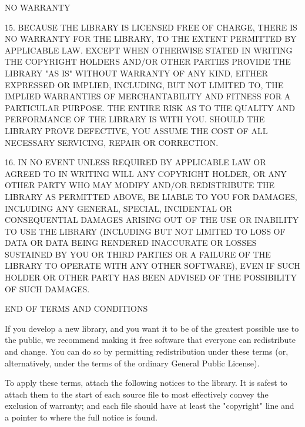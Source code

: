 \documentclass[a4paper,11pt]{report}
\begin{document}
\begin{center}
NO WARRANTY
\end{center}

15. BECAUSE THE LIBRARY IS LICENSED FREE OF CHARGE, THERE IS NO
WARRANTY FOR THE LIBRARY, TO THE EXTENT PERMITTED BY APPLICABLE LAW.
EXCEPT WHEN OTHERWISE STATED IN WRITING THE COPYRIGHT HOLDERS AND/OR
OTHER PARTIES PROVIDE THE LIBRARY "AS IS" WITHOUT WARRANTY OF ANY
KIND, EITHER EXPRESSED OR IMPLIED, INCLUDING, BUT NOT LIMITED TO, THE
IMPLIED WARRANTIES OF MERCHANTABILITY AND FITNESS FOR A PARTICULAR
PURPOSE. THE ENTIRE RISK AS TO THE QUALITY AND PERFORMANCE OF THE
LIBRARY IS WITH YOU. SHOULD THE LIBRARY PROVE DEFECTIVE, YOU ASSUME
THE COST OF ALL NECESSARY SERVICING, REPAIR OR CORRECTION.

16. IN NO EVENT UNLESS REQUIRED BY APPLICABLE LAW OR AGREED TO IN
WRITING WILL ANY COPYRIGHT HOLDER, OR ANY OTHER PARTY WHO MAY MODIFY
AND/OR REDISTRIBUTE THE LIBRARY AS PERMITTED ABOVE, BE LIABLE TO YOU
FOR DAMAGES, INCLUDING ANY GENERAL, SPECIAL, INCIDENTAL OR
CONSEQUENTIAL DAMAGES ARISING OUT OF THE USE OR INABILITY TO USE THE
LIBRARY (INCLUDING BUT NOT LIMITED TO LOSS OF DATA OR DATA BEING
RENDERED INACCURATE OR LOSSES SUSTAINED BY YOU OR THIRD PARTIES OR A
FAILURE OF THE LIBRARY TO OPERATE WITH ANY OTHER SOFTWARE), EVEN IF
SUCH HOLDER OR OTHER PARTY HAS BEEN ADVISED OF THE POSSIBILITY OF SUCH
DAMAGES.


\begin{center}
END OF TERMS AND CONDITIONS
\end{center}


If you develop a new library, and you want it to be of the greatest
possible use to the public, we recommend making it free software that
everyone can redistribute and change. You can do so by permitting
redistribution under these terms (or, alternatively, under the terms of the
ordinary General Public License).

To apply these terms, attach the following notices to the library. It is
safest to attach them to the start of each source file to most effectively
convey the exclusion of warranty; and each file should have at least the
"copyright" line and a pointer to where the full notice is found.
\end{document}

